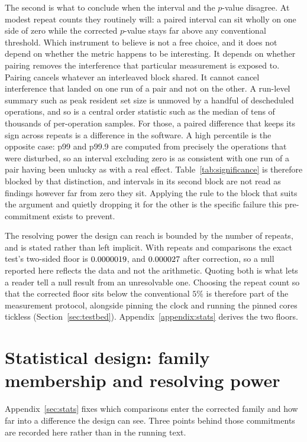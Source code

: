 \documentclass[english,oneside,a4paper,censored,csm,software-track-2020]{HYthesisML}
\begin{document}
\begin{appendices}
The second is what to conclude when the interval and the $p$-value disagree. At modest repeat
counts they routinely will: a paired interval can sit wholly on one side of zero while the
corrected $p$-value stays far above any conventional threshold. Which instrument to believe
is not a free choice, and it does not depend on whether the metric happens to be interesting. It
depends on whether pairing removes the interference that particular measurement is exposed to.
Pairing cancels whatever an interleaved block shared. It cannot cancel interference that landed
on one run of a pair and not on the other. A run-level summary such as peak resident set size is
unmoved by a handful of descheduled operations, and so is a central order statistic such as the
median of tens of thousands of per-operation samples. For those, a paired difference that keeps
its sign across repeats is a difference in the software. A high percentile is the
opposite case: p99 and p99.9 are computed from precisely the operations that were disturbed, so
an interval excluding zero is as consistent with one run of a pair having been unlucky as with a
real effect. Table~\ref{tab:significance} is therefore blocked by that distinction, and
intervals in its second block are not read as findings however far from zero they sit. Applying
the rule to the block that suits the argument and quietly dropping it for the other is the
specific failure this pre-commitment exists to prevent.

The resolving power the design can reach is bounded by the number of repeats, and is stated
rather than left implicit. With \NRepeats{} repeats and \NTests{} comparisons the exact test's
two-sided floor is $0.0000019$, and $0.000027$ after correction, so a null reported
here reflects the data and not the arithmetic. Quoting both is what lets a reader tell a null
result from an unresolvable one. Choosing the repeat count so that the corrected floor sits below
the conventional $5\%$ is therefore part of the measurement protocol, alongside pinning the clock
and running the pinned cores tickless (Section~\ref{sec:testbed}).
Appendix~\ref{appendix:stats} derives the two floors.


\section{Statistical design: family membership and resolving power\label{appendix:stats}}
Appendix~\ref{sec:stats} fixes which comparisons enter the corrected family and how far into a
difference the design can see. Three points behind those commitments are recorded here rather
than in the running text.


\end{appendices}
\end{document}
